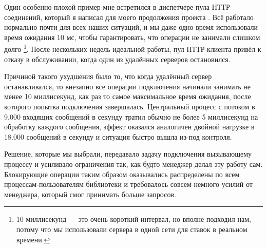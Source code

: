 Один особенно плохой пример мне встретился в диспетчере пула НТТР-соединений,  который я написал для моего продолжения проекта \href{https://github.com/ferd/lhttpc}{}. Всё работало нормально почти для всех наших ситуаций, и мы даже одно время использовали время ожидания 10 мс, чтобы гарантировать, что операции не занимали слишком долго \footnote{10 миллисекунд --- это очень короткий интервал, но вполне подходил нам, потому что мы использовали сервера в одной сети для ставок в реальном времени.}. После нескольких недель идеальной работы, пул НТТР-клиента привёл к отказу в обслуживании, когда один из удалённых серверов остановился.

Причиной такого ухудшения было то, что когда удалённый сервер останавливался, то внезапно все операции подключения начинали занимать не менее 10 миллисекунд, как раз то самое максимальное время ожидания, после которого попытка подключения завершалась. Центральный процесс с потоком в 9.000 входящих сообщений в секунду тратил обычно не более 5 миллисекунд на обработку каждого сообщения, эффект оказался аналогичен двойной нагрузке в 18.000 сообщений в секунду и ситуация быстро вышла из-под контроля.

Решение, которые мы выбрали, передавало задачу подключения вызывающему процессу и усиливало ограничения так, как будто менеджер делал эту работу сам. Блокирующие операции таким образом оказывались распределены по всем процессам-пользователям библиотеки и требовалось совсем немного усилий от менеджера, который смог принимать больше запросов.

